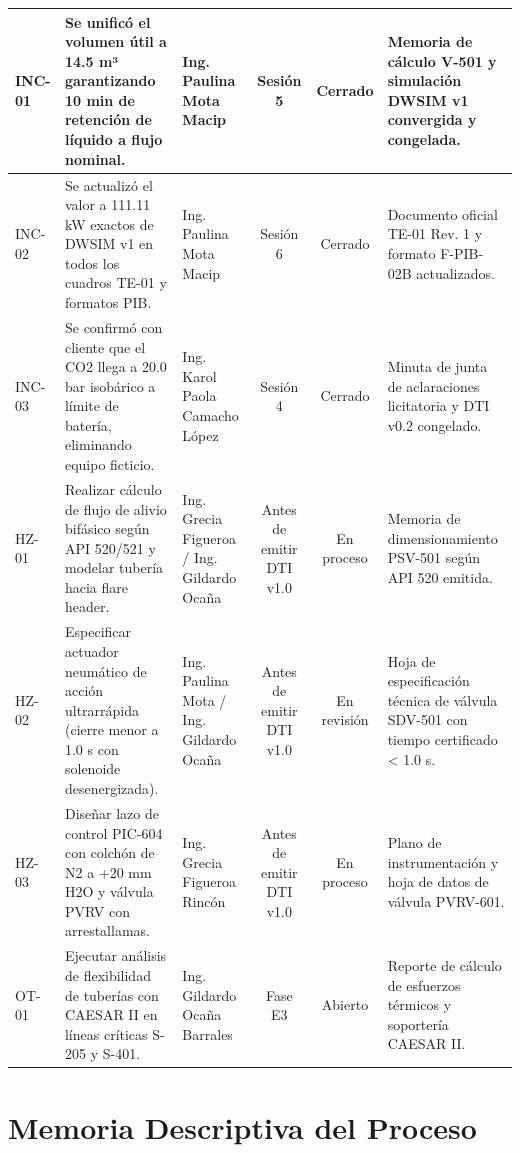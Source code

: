 \documentclass[10pt,letterpaper]{article}
\begin{document}
\begin{landscape}
\begin{xltabular}{\linewidth}{|l|p{6.5cm}|p{3.2cm}|c|c|>{\raggedright\arraybackslash}X|}
INC-01 & Se unificó el volumen útil a 14.5 m³ garantizando 10 min de retención de líquido a flujo nominal. & Ing. Paulina Mota Macip & Sesión 5 & Cerrado & Memoria de cálculo V-501 y simulación DWSIM v1 convergida y congelada. \\ \hline
INC-02 & Se actualizó el valor a 111.11 kW exactos de DWSIM v1 en todos los cuadros TE-01 y formatos PIB. & Ing. Paulina Mota Macip & Sesión 6 & Cerrado & Documento oficial TE-01 Rev. 1 y formato F-PIB-02B actualizados. \\ \hline
INC-03 & Se confirmó con cliente que el CO2 llega a 20.0 bar isobárico a límite de batería, eliminando equipo ficticio. & Ing. Karol Paola Camacho López & Sesión 4 & Cerrado & Minuta de junta de aclaraciones licitatoria y DTI v0.2 congelado. \\ \hline
HZ-01 & Realizar cálculo de flujo de alivio bifásico según API 520/521 y modelar tubería hacia flare header. & Ing. Grecia Figueroa / Ing. Gildardo Ocaña & Antes de emitir DTI v1.0 & En proceso & Memoria de dimensionamiento PSV-501 según API 520 emitida. \\ \hline
HZ-02 & Especificar actuador neumático de acción ultrarrápida (cierre menor a 1.0 s con solenoide desenergizada). & Ing. Paulina Mota / Ing. Gildardo Ocaña & Antes de emitir DTI v1.0 & En revisión & Hoja de especificación técnica de válvula SDV-501 con tiempo certificado < 1.0 s. \\ \hline
HZ-03 & Diseñar lazo de control PIC-604 con colchón de N2 a +20 mm H2O y válvula PVRV con arrestallamas. & Ing. Grecia Figueroa Rincón & Antes de emitir DTI v1.0 & En proceso & Plano de instrumentación y hoja de datos de válvula PVRV-601. \\ \hline
OT-01 & Ejecutar análisis de flexibilidad de tuberías con CAESAR II en líneas críticas S-205 y S-401. & Ing. Gildardo Ocaña Barrales & Fase E3 & Abierto & Reporte de cálculo de esfuerzos térmicos y soportería CAESAR II. \\ \hline
\end{xltabular}
\end{landscape}

\newpage
\section{Memoria Descriptiva del Proceso}
\end{document}
